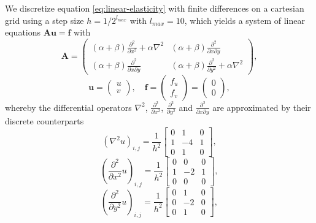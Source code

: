 We discretize equation \eqref{eq:linear-elasticity} with finite differences on a cartesian grid using a step size $h = 1/2^{l_{max}}$ with $l_{max} = 10$, which yields a system of linear equations $\boldsymbol{A} \boldsymbol{u} = \boldsymbol{f}$ with 
\begin{equation*}
	\boldsymbol{A} =
	\begin{pmatrix}
		(\alpha + \beta) \frac{\partial^2}{\partial x^2} + \alpha \nabla^2 & (\alpha + \beta) \frac{\partial^2}{\partial x \partial y} \\
		(\alpha + \beta) \frac{\partial^2}{\partial x \partial y} & (\alpha + \beta) \frac{\partial^2}{\partial y^2} +  \alpha \nabla^2
	\end{pmatrix},
\end{equation*}
\begin{equation*}
	\boldsymbol{u} = \begin{pmatrix}
		u \\ v
	\end{pmatrix}, \quad
	\boldsymbol{f} =
	\begin{pmatrix}
		f_{u} \\ f_{v}
	\end{pmatrix} =
	\begin{pmatrix}
		0 \\ 0
	\end{pmatrix},
\end{equation*}
whereby the differential operators $\nabla^2$, $\frac{\partial^2}{\partial x^2}$, $\frac{\partial^2}{\partial y^2}$ and $\frac{\partial^2}{\partial x \partial y}$ are approximated by their discrete counterparts
\begin{equation*}
	\left(\nabla^2 u\right)_{i,j} = 
	\frac{1}{h^2} \begin{bmatrix}
		0 & 1 & 0\\
		1 & -4 & 1 \\
		0 & 1 & 0  
	\end{bmatrix},
\end{equation*}
\begin{equation*}
	\left(\frac{\partial^2}{\partial x^2} u\right)_{i,j} =
		\frac{1}{h^2} \begin{bmatrix}
		0 & 0 & 0\\
		1 & -2 & 1 \\
		0 & 0 & 0  
	\end{bmatrix},
\end{equation*}
\begin{equation*}
	\left(\frac{\partial^2}{\partial y^2} u\right)_{i,j} =
	\frac{1}{h^2} \begin{bmatrix}
		0 & 1 & 0\\
		0 & -2 & 0 \\
		0 & 1 & 0  
	\end{bmatrix},
\end{equation*}
